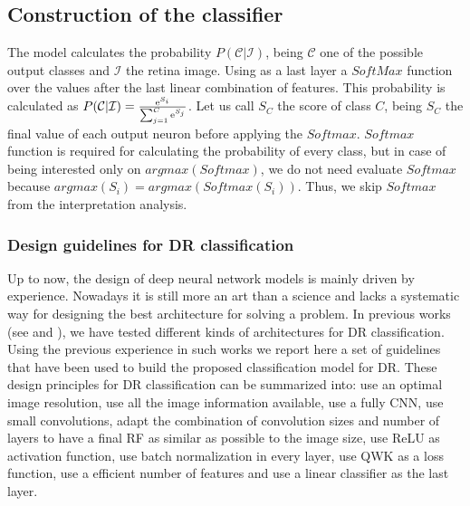 \subsection{Construction of the classifier}

The model calculates the probability $P(\mathcal{C} | \mathcal{I})$, being $\mathcal{C}$ one of the possible output classes and $\mathcal{I}$ the retina image. Using as a last layer a $SoftMax$ function over the values after the last linear combination of features. This probability is calculated as $P(\mathcal{C} | \mathcal{I}) = \frac{\mathrm{e}^{S_{i}}}{\sum_{j=1}^{C} \mathrm{e}^{S_{j}}}$. Let us call $S_{C}$ the score of class $C$, being $S_C$ the final value of each output neuron before applying the $Softmax$. $Softmax$ function is required for calculating the probability of every class, but in case of being interested only on $argmax(Softmax)$, we do not need evaluate $Softmax$ because $argmax(S_i) = argmax(Softmax(S_i))$. Thus, we skip $Softmax$ from the interpretation analysis.

\subsubsection{Design guidelines for DR classification} \label{class_guidelines}

Up to now, the design of deep neural network models is mainly driven  by experience. Nowadays it is still more an art than a science and lacks a systematic way for designing the best architecture for solving a problem. In previous works (see \citep{jdelatorre2016} and \citep{delatorre2017}), we have tested different kinds of architectures for DR classification. Using the previous experience in such works we report here a set of guidelines that have been used to build the proposed classification model for DR. These design principles for DR classification can be summarized into: use an optimal image resolution, use all the image information available, use a fully CNN, use small convolutions, adapt the combination of convolution sizes and number of layers to have a final RF as similar as possible to the image size, use ReLU as activation function, use batch normalization in every layer, use QWK as a loss function, use a efficient number of features and use a linear classifier as the last layer.

